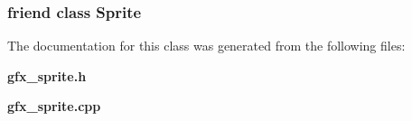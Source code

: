 \subsubsection{\setlength{\rightskip}{0pt plus 5cm}friend class {\bf Sprite}\hspace{0.3cm}{\tt  [friend]}}\label{classEngine_1_1SpriteAnimation_3292175d54d93d126ba2829249316344}




The documentation for this class was generated from the following files:\begin{CompactItemize}
\item 
{\bf gfx\_\-sprite.h}\item 
{\bf gfx\_\-sprite.cpp}\end{CompactItemize}
